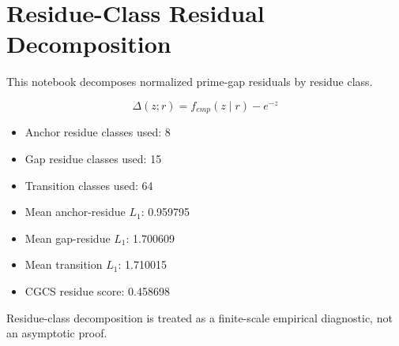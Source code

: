 \section*{Residue-Class Residual Decomposition}

This notebook decomposes normalized prime-gap residuals by residue class.

\[
\Delta(z;r)=f_{emp}(z\mid r)-e^{-z}
\]

\begin{itemize}
  \item Anchor residue classes used: 8
  \item Gap residue classes used: 15
  \item Transition classes used: 64
  \item Mean anchor-residue $L_1$: 0.959795
  \item Mean gap-residue $L_1$: 1.700609
  \item Mean transition $L_1$: 1.710015
  \item CGCS residue score: 0.458698
\end{itemize}

Residue-class decomposition is treated as a finite-scale empirical diagnostic, not an asymptotic proof.
